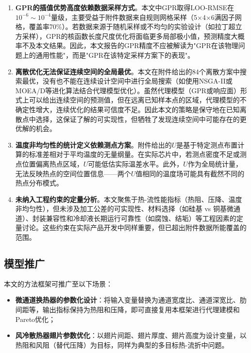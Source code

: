 \documentclass[12pt,a4paper]{ctexart}
\begin{document}
\begin{enumerate}
\item \textbf{GPR的插值优势高度依赖数据采样方式}。本文中GPR取得LOO-RMSE在$10^{-6}\sim10^{-4}$量级，主要受益于附件数据来自规则网格采样（5$\times$4$\times$6满因子网格，覆盖率70\%）。若数据来源于随机采样或不均匀的实验设计（如拉丁超立方采样），GPR的核函数长度尺度优化将面临更多局部极小值，预测精度大概率不及本文结果。因此，本文报告的GPR精度不应被解读为"GPR在该物理问题上的通用性能"，而是"GPR在该特定采样方案下的表现"。

\item \textbf{离散优化无法保证连续空间的全局最优}。本文在附件给出的84个离散方案中搜索最优，没有也不能在连续设计空间中进行全局搜索（如使用NSGA-II或MOEA/D等进化算法结合代理模型优化）。虽然代理模型（GPR或响应面）形式上可以给出连续空间的预测值，但在远离已知样本点的区域，代理模型的不确定性增大，连续优化的结果可信度不足。因此本文的策略是保守地在已知离散点中选择，这保证了解的可实现性，但牺牲了发现连续空间中可能存在的更优解的机会。

\item \textbf{温度非均匀性的统计定义依赖测点方案}。附件给出的$U$是基于特定测点布置计算的标准差相对于平均温度的无量纲量。在实际芯片中，若测点密度不足或测点位置偏离热点区域，$U$可能低估实际温差水平。此外，$U$作为全局统计量，无法反映热点的空间位置信息——两个$U$值相同的温度场可能具有截然不同的热点分布模式。

\item \textbf{未纳入工程约束的定量分析}。本文聚焦于热-流性能指标（热阻、压降、温度非均匀性），但未涉及加工公差的可实现性、材料选择（如硅基 vs 铜基微通道）、封装兼容性和冷却液长期运行可靠性（如腐蚀、结垢）等工程因素的定量讨论。这些约束在实际产品开发中同样重要，但已超出附件数据所能覆盖的范围。
\end{enumerate}

\subsection{模型推广}

本文的方法框架可推广至以下场景：

\begin{itemize}
\item \textbf{微通道换热器的参数化设计}：将输入变量替换为通道宽度比、通道深宽比、肋间距等，输出指标保持为热阻和压降，即可直接复用本框架进行代理建模和Pareto优化；
\item \textbf{风冷散热器翅片参数优化}：以翅片间距、翅片厚度、翅片高度为设计变量，以热阻和风阻（替代压降）为目标，同样为典型的多目标热-流折中问题。
\end{itemize}
\end{document}
